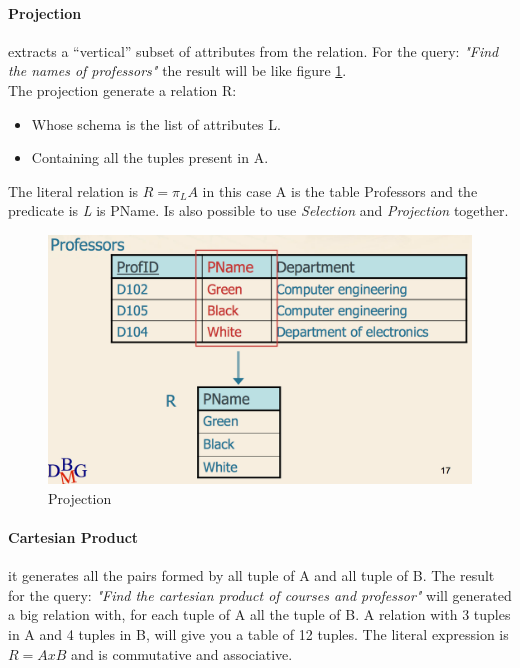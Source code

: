 \documentclass[12pt]{article}
\begin{document}
\paragraph{Projection} extracts a ``vertical'' subset of attributes from the relation. For the query: \textit{"Find the names of professors"} the result will be like figure \ref{fig:proj}.\\
The projection generate a relation R:
\begin{itemize}
  \item Whose schema is the list of attributes L.
  \item Containing all the tuples present in A.
\end{itemize}
The literal relation is $R=\pi_{L}A$ in this case A is the table Professors and the predicate is \textit{L} is PName. Is also possible to use \textit{Selection} and \textit{Projection} together.
\begin{figure}[H]
  \includegraphics[width=\textwidth]{images/proj.png}
  \caption{Projection}
  \label{fig:proj}
\end{figure}

\paragraph{Cartesian Product} it generates all the pairs formed by all tuple of A and all tuple of B. The result for the query: \textit{"Find the cartesian product of courses and professor"} will generated a big relation with, for each tuple of A all the tuple of B. A relation with 3 tuples in A and 4 tuples in B, will give you a table of 12 tuples. The literal expression is $R=AxB$ and is commutative and associative.
\end{document}

